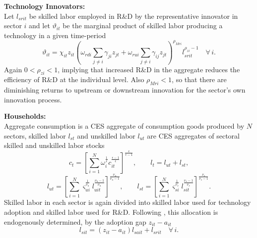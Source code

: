 \documentclass[compress,xcolor=dvipsnames]{beamer}
\begin{document}
\begin{frame}
\textbf{Technology Innovators:} \\ 
Let $l_{srit}$ be skilled labor employed in R\&D by the representative innovator in sector $i$ and let $\vartheta_{it}$ be the marginal product of skilled labor producing a technology in a given time-period
\begin{equation}
\vartheta_{it} = \chi_{it} z_{it} \left( \omega_{rdi} \sum_{j\neq i} \gamma_{ji} z_{jt} + \omega_{rui} \sum_{j\neq i} \gamma_{ij} z_{jt} \right)^{\rho_{Mri}} l_{srit}^{\rho_{zi}-1}\quad\forall\,i.
\end{equation}
Again $0<\rho_{zi}<1$, implying that increased R\&D in the aggregate reduces the efficiency of R\&D at the individual level. Also $\rho_{Mri}<1$, so that there are diminishing returns to upstream or downstream innovation for the sector's own innovation process.
\end{frame}

\begin{frame}
\textbf{Households:} \\ 
Aggregate consumption is a CES aggregate of consumption goods produced by $N$ sectors,  skilled labor $l_{st}$ and unskilled labor $l_{ut}$ are CES aggregates of sectoral skilled and unskilled labor stocks
\begin{equation}
c_t = \left[ \sum_{i=1}^N \omega_i^{\frac{1}{\epsilon}}c_{it}^{\frac{\epsilon-1}{\epsilon}}\right]^{\frac{\epsilon}{\epsilon-1}},\qquad l_t =  l_{ut} +  l_{st},
\end{equation}
\begin{equation}
l_{ut} = \left[\sum_{i=1}^N \varsigma_{ui}^{\frac{1}{\nu_u}}l_{uit}^{\frac{\nu_u-1}{\nu_u}}\right]^{\frac{\nu_u}{\nu_u-1}}, \qquad l_{st} = \left[\sum_{i=1}^N \varsigma_{si}^{\frac{1}{\nu_s}}l_{sit}^{\frac{\nu_s-1}{\nu_s}}\right]^{\frac{\nu_s}{\nu_s-1}}.
\end{equation}
Skilled labor in each sector is again divided into skilled labor used for technology adoption and skilled labor used for R\&D. Following \citet{Anzoategui2017}, this allocation is endogenously determined, by the adoption gap $z_{it}-a_{it}$
\begin{equation}
l_{sit} = (z_{it}-a_{it})l_{sait} + l_{srit}\quad\forall\,i.
\end{equation}
\end{frame}
\end{document}
